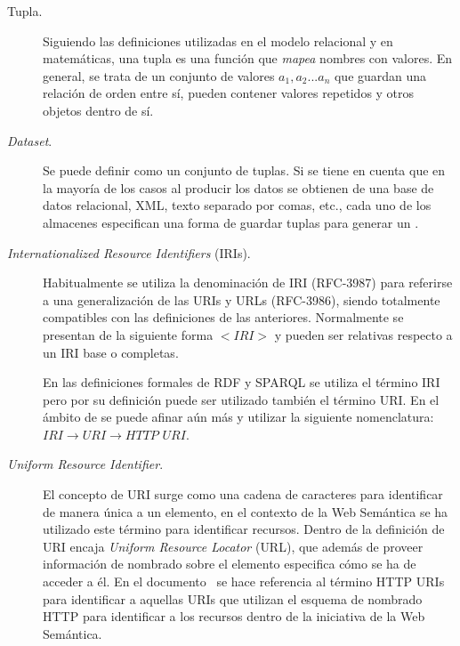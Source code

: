 \begin{description}

 \item [Tupla.] Siguiendo las definiciones utilizadas en el modelo relacional y en matemáticas, una tupla
es una función que \textit{mapea} nombres con valores. En general, se trata de un conjunto de valores
$a_1,a_2...a_n$ que guardan una relación de orden entre sí, pueden contener valores repetidos y otros objetos dentro de sí.

\item [\textit{Dataset}.] Se puede definir como un conjunto de tuplas. Si se tiene en cuenta que en la mayoría de los
casos al producir \linkeddata los datos se obtienen de una base de datos relacional, \gls{XML}, texto separado por comas, etc., cada uno de los almacenes especifican una forma de guardar tuplas para generar un \dataset.

\item [\textit{Internationalized Resource Identifiers} (\gls{IRI}s).] Habitualmente se utiliza la denominación de IRI (\gls{RFC}-3987) para referirse
a una generalización de las \gls{URI}s y URLs (RFC-3986), siendo totalmente compatibles con las definiciones de las anteriores. 
Normalmente se presentan de la siguiente forma $<IRI>$ y pueden ser relativas respecto a un IRI base o completas.

En las definiciones formales de \gls{RDF} y \gls{SPARQL} se utiliza el término IRI pero por su definición puede ser utilizado
también el término URI. En el ámbito de \linkeddata se puede afinar aún más y utilizar la siguiente nomenclatura:
 $IRI \longrightarrow  URI \longrightarrow  HTTP$ $URI$.

\item [\textit{Uniform Resource Identifier}.] El concepto de URI surge como una cadena de caracteres para identificar de manera única
a un elemento, en el contexto de la Web Semántica se ha utilizado este término para identificar recursos. Dentro
de la definición de URI encaja \textit{Uniform Resource Locator} (\gls{URL}), que además de proveer información de nombrado sobre el elemento
especifica cómo se ha de acceder a él. En el documento~\cite{RDF} se hace referencia al término HTTP URIs para identificar
a aquellas URIs que utilizan el esquema de nombrado \gls{HTTP} para identificar a los recursos dentro de la iniciativa de la Web Semántica.


\end{description}
